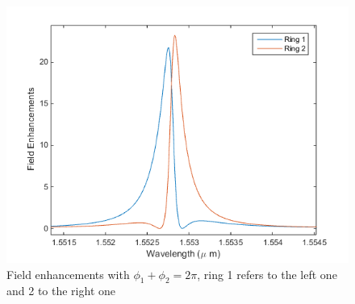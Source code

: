 \begin{figure}
\centering
\includegraphics[width = .8\textwidth]{img/FE_fase_2pi}
\caption{Field enhancements with $\phi_1+\phi_2 = 2\pi$, ring 1 refers to the left one and 2 to the right one}
\label{FE}
\end{figure}